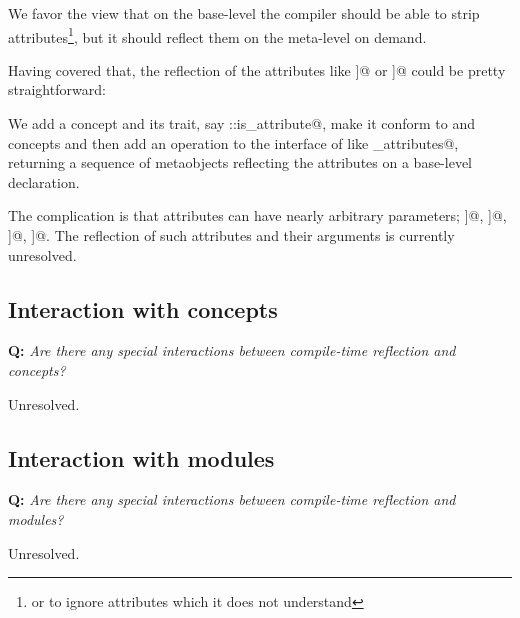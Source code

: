We favor the view that on the base-level the compiler should be able to
strip attributes\footnote{or to ignore attributes which it does not understand},
but it should reflect them on the meta-level on demand.

Having covered that, the reflection of the  attributes like
\verb@[[attr1]]@ or \verb@[[namespace::attr2]]@ could be pretty straightforward:

We add a  concept and its trait, say \verb@meta::is_attribute@,
make it conform to  and  concepts and then add an
operation to the interface of  like \verb@get_attributes@, returning
a sequence of metaobjects reflecting the attributes on a base-level declaration.

The complication is that attributes can have nearly arbitrary parameters;
\verb@[[probably(true)]]@, \verb@[[deprecated("reason")]]@,
\verb@[[visibility(hidden)]]@, \verb@[[gnu::aligned(64)]]@. The reflection of
such attributes and their arguments is currently unresolved.

\subsection{Interaction with concepts}

\textbf{Q:} {\em Are there any special interactions between compile-time
reflection and concepts?}

Unresolved.

\subsection{Interaction with modules}

\textbf{Q:} {\em Are there any special interactions between compile-time
reflection and modules?}

Unresolved.

